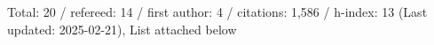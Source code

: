 Total: 20 / refereed: 14 / first author: 4 / citations: 1,586 / h-index: 13 (Last updated: 2025-02-21), List attached below